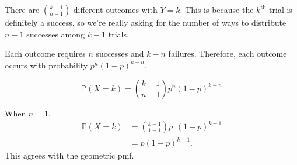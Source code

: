 \documentclass[12pt]{article}
\begin{document}
\newpage
{}

\medskip
{} There are ${k-1 \choose n-1}$ different outcomes with $Y=k$. This is because the $k^\text{th}$ trial is definitely a success, so we're really asking for the number of ways to distribute $n-1$ successes among $k-1$ trials.

\medskip
{} Each outcome requires $n$ successes and $k-n$ failures. Therefore, each outcome occurs with probability $p^n(1-p)^{k-n}$.

\medskip
{} $$\mathbb P(X=k) = {k-1 \choose n-1 }p^n(1-p)^{k-n}$$

\medskip
{} When $n=1$,
\begin{align*}
    \mathbb P(X=k) &= {k-1 \choose 1 - 1}p^1(1-p)^{k-1} \\
                   &= p(1-p)^{k-1}.
\end{align*}
This agrees with the geometric pmf.
\end{document}
